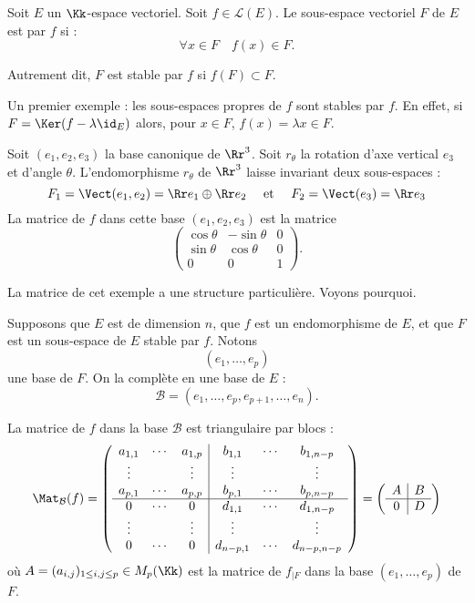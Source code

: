 \documentclass[12pt, class=report,crop=false]{standalone}
\begin{document}
\begin{definition}
Soit $E$ un $\Kk$-espace vectoriel. Soit $f \in \mathcal{L}(E)$. 
Le sous-espace vectoriel $F$ de $E$ est  par $f$ si :
\[\forall x \in F \quad f(x) \in F .\]
\end{definition}


Autrement dit, $F$ est stable par $f$ si $f(F) \subset F$.

Un premier exemple : les sous-espaces propres de $f$ sont stables par $f$.
En effet, si $F = \Ker(f-\lambda \id_E)$ alors, pour $x \in F$, $f(x) = \lambda x \in F$.



\begin{exemple}
\label{ex:polyendorot}
Soit $(e_1,e_2,e_3)$ la base canonique de $\Rr^3$. Soit $r_\theta$ la rotation d'axe vertical $e_3$ et d'angle $\theta$. L'endomorphisme $r_\theta$ de $\Rr^3$ laisse invariant deux sous-espaces :
\[F_1 = \Vect(e_1,e_2) = \Rr e_1 \oplus \Rr e_2 \quad \text{ et } \quad  F_2 = \Vect(e_3) = \Rr e_3\]
La matrice de $f$ dans cette base $(e_1,e_2,e_3)$ est la matrice
\[\begin{pmatrix}
\cos \theta & -\sin \theta& 0\\
\sin \theta & \cos \theta & 0\\
0&0&1
\end{pmatrix}.\]
\end{exemple}

La matrice de cet exemple a une structure particulière. Voyons pourquoi.

\bigskip


Supposons que $E$ est de dimension $n$, que $f$ est un endomorphisme de $E$, et que $F$ est un sous-espace de $E$ stable par $f$. Notons
\[(e_1,\ldots,e_p)\]
une base de $F$. On la complète en une base de $E$ :
\[\mathcal{B} = (e_1,\ldots,e_p,e_{p+1},\ldots,e_n).\]

La matrice de $f$ dans la base $\mathcal{B}$ est triangulaire par blocs :
\[\Mat_{\mathcal{B}}(f)  = 
\left(\begin{array}{ccc|ccc}
a_{1,1}&\cdots&a_{1,p}&b_{1,1}&\cdots&b_{1,n-p}\\
\vdots&&\vdots&\vdots&&\vdots\\
a_{p,1}&\cdots&a_{p,p}&b_{p,1}&\cdots&b_{p,n-p}\\ \hline
0 &\cdots&0&d_{1,1}&\cdots&d_{1,n-p}\\
\vdots&&\vdots&\vdots&&\vdots\\
0&\cdots&0&d_{n-p,1}&\cdots&d_{n-p,n-p}
\end{array}\right)
=
\left(\begin{array}{c|c}
A & B\\ \hline
0 & D\\
\end{array}\right)
\]
où $A=(a_{i,j})_{1 \le i,j \le p}\in M_p(\Kk)$ est la matrice de $f_{|F}$ dans la base $(e_1,\ldots,e_p)$ de $F$.
\end{document}
